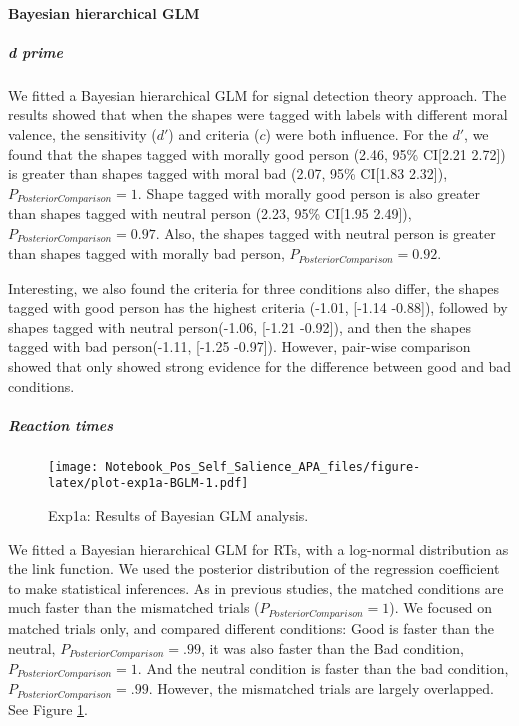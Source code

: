 \documentclass[
  english,
  man]{apa6}
\let\oldparagraph\paragraph
\renewcommand{\paragraph}[1]{\oldparagraph{#1}\mbox{}}
\let\oldsubparagraph\subparagraph
\renewcommand{\subparagraph}[1]{\oldsubparagraph{#1}\mbox{}}
\begin{document}
\hypertarget{bayesian-hierarchical-glm}{%
\paragraph{Bayesian hierarchical GLM}\label{bayesian-hierarchical-glm}}

\hypertarget{d-prime-1}{%
\subparagraph{d prime}\label{d-prime-1}}

We fitted a Bayesian hierarchical GLM for signal detection theory approach. The results showed that when the shapes were tagged with labels with different moral valence, the sensitivity (\(d'\)) and criteria (\(c\)) were both influence. For the \(d'\), we found that the shapes tagged with morally good person (2.46, 95\% CI{[}2.21 2.72{]}) is greater than shapes tagged with moral bad (2.07, 95\% CI{[}1.83 2.32{]}), \(P_{PosteriorComparison} = 1\). Shape tagged with morally good person is also greater than shapes tagged with neutral person (2.23, 95\% CI{[}1.95 2.49{]}), \(P_{PosteriorComparison} = 0.97\). Also, the shapes tagged with neutral person is greater than shapes tagged with morally bad person, \(P_{PosteriorComparison} = 0.92\).

Interesting, we also found the criteria for three conditions also differ, the shapes tagged with good person has the highest criteria (-1.01, {[}-1.14 -0.88{]}), followed by shapes tagged with neutral person(-1.06, {[}-1.21 -0.92{]}), and then the shapes tagged with bad person(-1.11, {[}-1.25 -0.97{]}). However, pair-wise comparison showed that only showed strong evidence for the difference between good and bad conditions.

\hypertarget{reaction-times-1}{%
\subparagraph{Reaction times}\label{reaction-times-1}}

\begin{figure}
\centering
\texttt{[image: Notebook\_Pos\_Self\_Salience\_APA\_files/figure-latex/plot-exp1a-BGLM-1.pdf]}
\caption{\label{fig:plot-exp1a-BGLM}Exp1a: Results of Bayesian GLM analysis.}
\end{figure}

We fitted a Bayesian hierarchical GLM for RTs, with a log-normal distribution as the link function. We used the posterior distribution of the regression coefficient to make statistical inferences. As in previous studies, the matched conditions are much faster than the mismatched trials (\(P_{PosteriorComparison} = 1\)). We focused on matched trials only, and compared different conditions: Good is faster than the neutral, \(P_{PosteriorComparison} = .99\), it was also faster than the Bad condition, \(P_{PosteriorComparison} = 1\). And the neutral condition is faster than the bad condition, \(P_{PosteriorComparison} = .99\). However, the mismatched trials are largely overlapped. See Figure \ref{fig:plot-exp1a-BGLM}.
\end{document}
